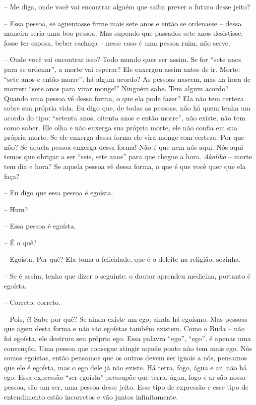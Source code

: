 -- Me diga, onde você vai encontrar alguém que saiba prever o
futuro desse jeito?

-- Essa pessoa, se aguentasse firme mais sete anos e então se
ordenasse – dessa maneira seria uma boa pessoa. Mas supondo que
passados sete anos desistisse, fosse ter esposa, beber cachaça – nesse
caso é uma pessoa ruim, não serve.

-- Onde você vai encontrar isso? Todo mundo quer ser assim. Se for
“sete anos para se ordenar”, a morte vai esperar? Ele enxergou assim
antes de ir. Morte: “sete anos e então morre”, há algum acordo? As
pessoas nascem, mas na hora de morrer: “sete anos para virar monge!”
Ninguém sabe. Tem algum acordo? Quando uma pessoa vê dessa forma, o que
ela pode fazer? Ela não tem certeza sobre sua própria vida. Eu digo
que, de todas as pessoas, não há quem tenha um acordo do tipo: “setenta
anos, oitenta anos e então morre”, não existe, não tem como saber. Ele
olha e não enxerga sua própria morte, ele não confia em sua própria
morte. Se ele enxerga dessa forma ele vira monge com certeza. Por que
não? Se aquela pessoa enxerga dessa forma! Não é que nem nós aqui. Nós
aqui temos que obrigar a ser “seis, sete anos” para que chegue a hora.
\textit{Akaliko} – morte tem dia e hora? Se aquela pessoa vê dessa
forma, o que é que você quer que ela faça? 

-- Eu digo que essa pessoa é egoísta. 

-- Hum?

-- Essa pessoa é egoísta.

-- É o quê?

-- Egoísta. Por quê? Ela toma a felicidade, que é o deleite na
religião, sozinha. 

-- Se é assim, tenho que dizer o seguinte: o doutor aprendeu
medicina, portanto é egoísta.

-- Correto, correto.

-- Pois, é! Sabe por quê? Se ainda existe um ego, ainda há egoísmo.
Mas pessoas que agem desta forma e não são egoístas também existem.
Como o Buda – não foi egoísta, ele destruiu seu próprio ego. Essa
palavra “ego”, “ego”, é apenas uma convenção. Uma pessoa que consegue
atingir aquele ponto não tem mais ego. Nós somos egoístas, então
pensamos que os outros devem ser iguais a nós, pensamos que ele é
egoísta, mas o ego dele já não existe. Há terra, fogo, água e ar, não
há ego. Essa expressão “ser egoísta” pressupõe que terra, água, fogo e
ar são nossa pessoa, são um ser, uma pessoa desse jeito. Esse tipo de
expressão e esse tipo de entendimento estão incorretos e vão juntos
infinitamente. 

